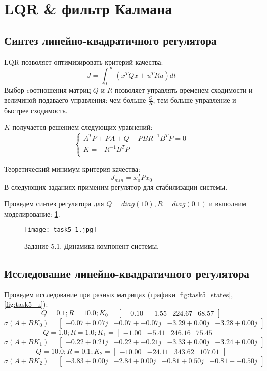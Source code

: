 \section{LQR \& фильтр Калмана}
\subsection{Синтез линейно-квадратичного регулятора}
LQR позволяет оптимизировать критерий качества:
\[J = \int_0^\infty (x^T Q x + u^T R u)dt \]
Выбор cоотношения матриц \(Q\) и \(R\) позволяет управлять временем сходимости и величиной подаваего управления: чем больше \(\frac{Q}{R}\), тем больше управление и быстрее сходимость.

\(K\) получается решением следующих уравнений:
    \begin{equation}
        \begin{cases}
            A^T P + P A + Q - PBR^{-1}B^TP = 0\\
            K = -R^{-1} B^T P \\
        \end{cases}
    \end{equation}

Теоретический минимум критерия качества:
\[J_{min} = x_0^T P x_0\]
В следующих заданиях применим регулятор для стабилизации системы.

Проведем синтез регулятора для $Q = diag(10), R=diag(0.1)$ и выполним моделирование: \ref{fig:task5_1}.
\begin{figure}[]
    \centering
    \texttt{[image: task5\_1.jpg]}
    \caption{Задание 5.1. Динамика компонент системы.}
    \label{fig:task5_1}
\end{figure}

\subsection{Исследование линейно-квадратичного регулятора}
Проведем исследование при разных матрицах (графики \ref{fig:task5_states}, \ref{fig:task5_u}):
\[Q = 0.1; R = 10.0; K_0 = \begin{bmatrix}
    -0.10 & -1.55 &  224.67 &  68.57
   \end{bmatrix}\]
   \[\sigma(A+BK_0) = \begin{bmatrix}
    -0.07 + 0.07j & -0.07 + -0.07j & -3.29 + 0.00j & -3.28 + 0.00j
   \end{bmatrix}\]
   \[Q = 1.0; R = 1.0; K_1 = \begin{bmatrix}
    -1.00 & -5.41 &  246.16 &  75.45
   \end{bmatrix}\]
   \[\sigma(A+BK_1) = \begin{bmatrix}
    -0.22 + 0.21j & -0.22 + -0.21j & -3.33 + 0.00j & -3.24 + 0.00j
   \end{bmatrix}\]
   \[Q = 10.0; R = 0.1; K_2 = \begin{bmatrix}
    -10.00 & -24.11 &  343.62 &  107.01
   \end{bmatrix}\]
   \[\sigma(A+BK_2) = \begin{bmatrix}
    -3.83 + 0.00j & -2.84 + 0.00j & -0.81 + 0.50j & -0.81 + -0.50j
   \end{bmatrix}\]

